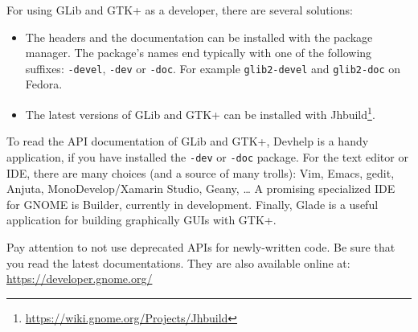 For using GLib and GTK+ as a developer, there are several solutions:
\begin{itemize}
  \item The headers and the documentation can be installed with the package manager. The package's names end typically with one of the following suffixes: \texttt{-devel}, \texttt{-dev} or \texttt{-doc}. For example \texttt{glib2-devel} and \texttt{glib2-doc} on Fedora.
  \item The latest versions of GLib and GTK+ can be installed with Jhbuild\footnote{\url{https://wiki.gnome.org/Projects/Jhbuild}}.
\end{itemize}

To read the API documentation of GLib and GTK+, Devhelp is a handy application, if you have installed the \texttt{-dev} or \texttt{-doc} package. For the text editor or IDE, there are many choices (and a source of many trolls): Vim, Emacs, gedit, Anjuta, MonoDevelop/Xamarin Studio, Geany, … A promising specialized IDE for GNOME is Builder, currently in development. Finally, Glade is a useful application for building graphically GUIs with GTK+.

Pay attention to not use deprecated APIs for newly-written code. Be sure that you read the latest documentations. They are also available online at:\\
\url{https://developer.gnome.org/}
